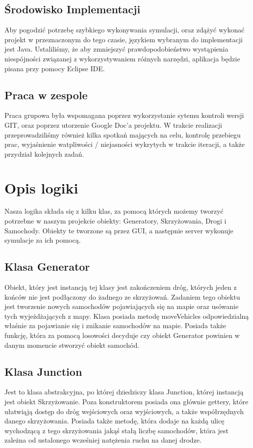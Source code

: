 \documentclass{article}
\begin{document}
\subsection{Środowisko Implementacji}
    Aby pogodzić potrzebę szybkiego wykonywania symulacji, oraz zdążyć wykonać projekt w przeznaczonym do tego czasie, językiem wybranym do implementacji jest Java. Ustaliliśmy, że aby zmniejszyć prawdopodobieństwo wystąpienia niespójności związanej z wykorzystywaniem różnych narzędzi, aplikacja będzie pisana przy pomocy Eclipse IDE. 

\subsection{Praca w zespole}
    Praca grupowa była wspomagana poprzez wykorzystanie sytemu kontroli wersji GIT, oraz poprzez utorzenie Google Doc'a projektu. W trakcie realizacji przeprowadziliśmy również kilka spotkań mających na celu, kontrolę przebiegu prac, wyjaśnienie watpliwości / niejasności wykrytych w trakcie iteracji, a także przydział kolejnych zadań.

\section{Opis logiki}
    Nasza logika składa się z kilku klas, za pomocą których możemy tworzyć potrzebne w naszym projekcie obiekty: Generatory, Skrzyżowania, Drogi i Samochody. Obiekty te tworzone są przez GUI, a następnie server wykonuje symulacje za ich pomocą.

\subsection{Klasa Generator}
    Obiekt, który jest instancją tej klasy jest zakończeniem dróg, których jeden z końców nie jest podłączony do żadnego ze skrzyżowań. Zadaniem tego obiektu jest tworzenie nowych samochodów pojawiających się na mapie oraz usówanie tych wyjeżdżających z mapy. Klasa posiada metodę moveVehicles odpowiedzialną właśnie za pojawianie się i znikanie samochodów na mapie. Posiada także funkcję, która za pomocą losowości decyduje czy obiekt Generator powinien w danym momencie stworzyć obiekt samochód.

\subsection{Klasa Junction}
    Jest to klasa abstrakcyjna, po której dziedziczy klasa Junction, której instancją jest obiekt Skrzyżowanie. Poza konstruktorem posiada ona głównie gettery, które ułatwiąją dostęp do dróg wejściowych oraz wyjściowych, a także współrzędnych danego skrzyżowania. Posiada także metodę, która dodaje na każdą ulicę wychodzącą z tego skrzyżowania jakąś stałą liczbę samochodów, która jest zależna od ustalonego wcześniej natężenia ruchu na danej drodze.
\end{document}
